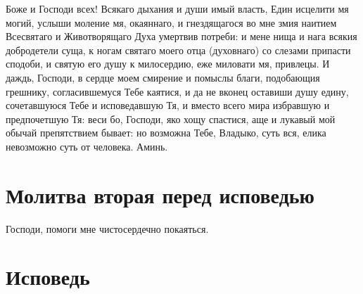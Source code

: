 \begin{mymulticols}

Боже и Господи всех! Всякаго дыхания и души имый власть, Един исцелити мя могий, услыши моление мя, окаяннаго, и гнездящагося во мне змия наитием Всесвятаго и Животворящаго Духа умертвив потреби: и мене нища и нага всякия добродетели суща, к ногам святаго моего отца (духовнаго) со слезами припасти сподоби, и святую его душу к милосердию, еже миловати мя, привлецы. И даждь, Господи, в сердце моем смирение и помыслы благи, подобающия грешнику, согласившемуся Тебе каятися, и да не вконец оставиши душу едину, сочетавшуюся Тебе и исповедавшую Тя, и вместо всего мира избравшую и предпочетшую Тя: веси бо, Господи, яко хощу спастися, аще и лукавый мой обычай препятствием бывает: но возможна Тебе, Владыко, суть вся, елика невозможно суть от человека. Аминь. 

\end{mymulticols}

\section{Молитва вторая перед исповедью}
 

{\centering Господи, помоги мне чистосердечно покаяться.\par}

\section{Исповедь}


